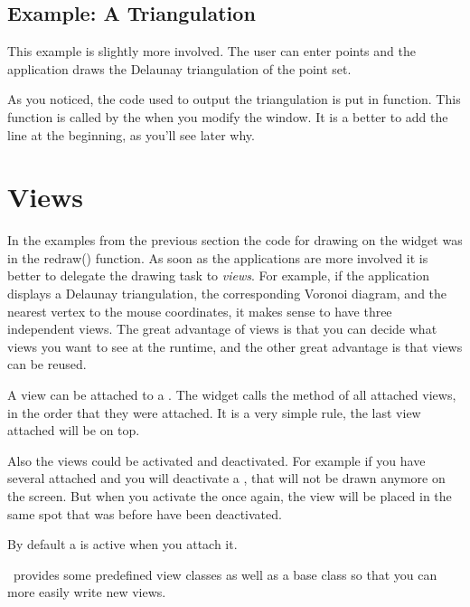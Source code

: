 \subsection{Example: A Triangulation}

This example is slightly more involved. The user can enter points and the application
draws the Delaunay triangulation of the point set. 


As you noticed, the code used to output the triangulation is put in  function.
This function is called by the  when you modify the window. It is a better to
add the line  at the beginning, as you'll see later why.

\section{Views}
\label{Qt_widget_views}

In the examples from the previous section the code for drawing on the
widget was in the redraw() function. As soon as the applications are more 
involved it is better to delegate the drawing task to {\em views}. 
For example, if the application displays a Delaunay triangulation, the corresponding Voronoi diagram,
 and the nearest vertex to the mouse coordinates, it makes
sense to have three independent views. The great advantage of views is that you
 can decide what views you want to see at the runtime, and the other great 
advantage is that views can be reused.

A view can be attached to a . The widget calls the method  of all attached views, in the order 
that they were attached. It is a very simple rule, the last view attached will be on top.

Also the views could be activated and deactivated. For example if you have several  attached and you
will deactivate a , that  will not be drawn anymore on the screen. But when you activate 
the  once again, the view will be placed in the same spot that was before have been deactivated.

By default a  is active when you attach it.

\cgal\ provides some predefined view classes as well as a base class
so that you can more easily write new views.



